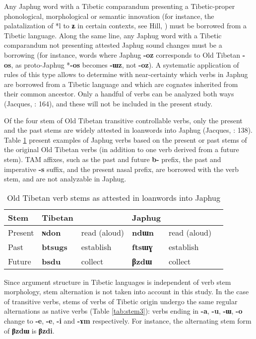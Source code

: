 \documentclass[oneside,a4paper,11pt]{article}
\newcommand{\ipa}[1]{{\phon\textbf{\mbox{#1}}}} %
\begin{document}
Any Japhug word with a Tibetic comparandum presenting a Tibetic-proper phonological, morphological or semantic innovation (for instance, the palatalization of *l to \ipa{ʑ} in certain contexts, see Hill, \citeyear{hill13laterals}) must be borrowed from a Tibetic language. Along the same line, any Japhug word with a Tibetic comparandum not presenting attested Japhug sound changes must be a borrowing (for instance, words where Japhug \ipa{-oz} corresponds to Old Tibetan \ipa{-os}, as proto-Japhug *\ipa{-os} becomes \ipa{-ɯz}, not \ipa{-oz}). A systematic application of rules of this type allows to determine with near-certainty which verbs in Japhug are borrowed from a Tibetic language and which are cognates inherited from their common ancestor. Only a handful of verbs can be analyzed both ways (Jacques, \citeyear{jacques04these}: 164), and these will not be included in the present study. 

Of the four stem of Old Tibetan transitive controllable verbs, only the present and the past stems are widely attested in loanwords into Japhug (Jacques, \citeyear{jacques04these}: 138). Table  \ref{tab:four.stems} present examples of Japhug verbs based on the present or past stems of the original Old Tibetan verbs (in addition to one verb derived from a future stem). TAM affixes, such as the past and future \ipa{b-} prefix, the past and imperative \ipa{-s} suffix, and the present nasal prefix, are borrowed with the verb stem, and are not analyzable in Japhug.

\begin{table}[H]
\caption{Old Tibetan verb stems as attested in loanwords into Japhug} \label{tab:four.stems} \centering
\begin{tabular}{llllll}
\toprule
Stem&Tibetan && Japhug &\\
\midrule
Present & \ipa{ɴdon} & read (aloud) & \ipa{ndɯn} & read (aloud)&\\
Past  & \ipa{btsugs} & establish & \ipa{ftsɯɣ} &establish&\\
Future & \ipa{bsdu} & collect & \ipa{βzdɯ} & collect\\
\bottomrule
\end{tabular}
\end{table}

Since argument structure in Tibetic languages is independent of verb stem morphology, stem alternation is not taken into account in this study. In the case of transitive verbs, stems of verbs of Tibetic origin undergo the same regular alternations  as native verbs (Table \ref{tab:stem3}): verbs ending in \ipa{-a}, \ipa{-u}, \ipa{-ɯ}, \ipa{-o} change to \ipa{-e}, \ipa{-e}, \ipa{-i} and \ipa{-ɤm} respectively. For instance, the alternating stem form of \ipa{βzdɯ} is \ipa{βzdi}. 
\end{document}
